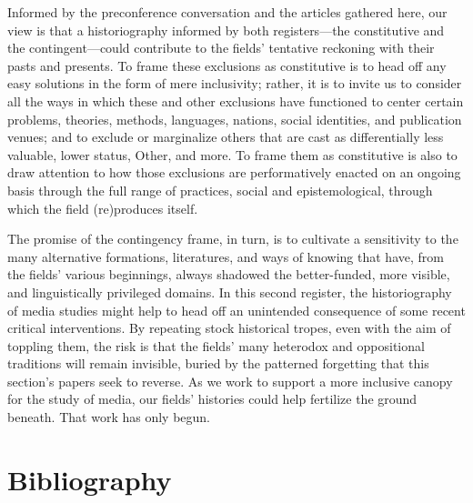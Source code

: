 \documentclass{tufte-handout}
\begin{document}
Informed by the preconference conversation and the articles gathered
here, our view is that a historiography informed by both registers---the
constitutive and the contingent---could contribute to the fields'
tentative reckoning with their pasts and presents. To frame these
exclusions as constitutive is to head off any easy solutions in the form
of mere inclusivity; rather, it is to invite us to consider all the ways
in which these and other exclusions have functioned to center certain
problems, theories, methods, languages, nations, social identities, and
publication venues; and to exclude or marginalize others that are cast
as differentially less valuable, lower status, Other, and more. To frame
them as constitutive is also to draw attention to how those exclusions
are performatively enacted on an ongoing basis through the full range of
practices, social and epistemological, through which the field
(re)produces itself.

The promise of the contingency frame, in turn, is to cultivate a
sensitivity to the many alternative formations, literatures, and ways of
knowing that have, from the fields' various beginnings, always shadowed
the better-funded, more visible, and linguistically privileged domains.
In this second register, the historiography of media studies might help
to head off an unintended consequence of some recent critical
interventions. By repeating stock historical tropes, even with the aim
of toppling them, the risk is that the fields' many heterodox and
oppositional traditions will remain invisible, buried by the patterned
forgetting that this section's papers seek to reverse. As we work to
support a more inclusive canopy for the study of media, our fields'
histories could help fertilize the ground beneath. That work has only
begun.






\section{Bibliography}\label{bibliography}
\end{document}
